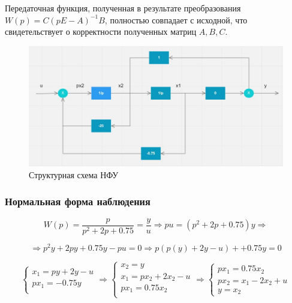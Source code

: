 \documentclass[14pt,a4paper,report]{report}
\begin{document}
Передаточная функция, полученная в результате преобразования $W(p)=C(pE-A)^{-1}B$, полностью совпадает с исходной, что свидетельствует о корректности полученных матриц  $A, B, C$. 


\begin{figure}[h!]
	\centering
	\includegraphics[scale = 0.6]{images/nfu.jpg}
	\caption{Структурная схема НФУ}
	\label{image:1}
\end{figure}

\subsubsection{Нормальная форма наблюдения}

\begin{equation*}
\text{$W(p)=\frac{p}{p^2+2p+0.75}=\frac{y}{u}$}
\Longrightarrow
\text{$pu=(p^2+2p+0.75)y$}
\Longrightarrow
\end{equation*}

\begin{equation*}
\Longrightarrow
\text{$p^2y+2py+0.75y - pu =0$}
\Longrightarrow
\text{$p(p(y)+2y-u)++0.75y=0$}
\end{equation*}

\begin{equation*}
\begin{cases}
	\text{$x_1=py+2y-u$} \\
	\text{$px_1=-0.75y$} \\
\end{cases}
\Longrightarrow
\begin{cases}
	\text{$x_2=y$}\\
	\text{$x_1=px_2+2x_2-u$} \\
	\text{$px_1=0.75x_2$} \\
\end{cases}
\Longrightarrow
\begin{cases}
	\text{$px_1=0.75x_2$} \\
	\text{$px_2=x_1-2x_2+u$} \\
	\text{$y=x_2$}
\end{cases}
\end{equation*}
\end{document}
